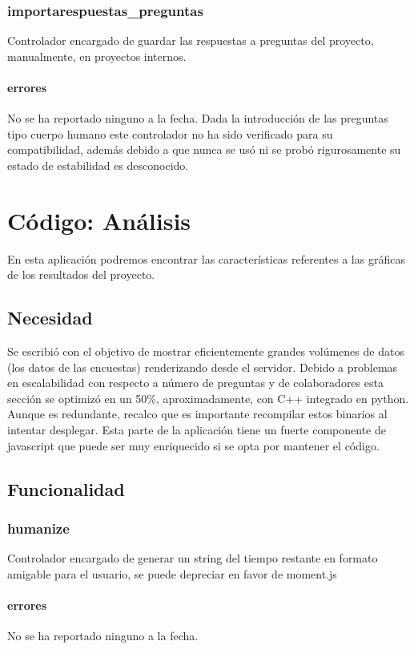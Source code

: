 \documentclass[10pt,a4paper]{book}
\begin{document}
	\subsection{importarespuestas\_preguntas}
	Controlador encargado de guardar las respuestas a preguntas del proyecto, manualmente, en proyectos internos.
	\subsubsection{errores}
	No se ha reportado ninguno a la fecha. Dada la introducción de las preguntas tipo cuerpo humano este controlador no ha sido verificado para su compatibilidad, además debido a que nunca se usó ni se probó rigurosamente su estado de estabilidad es desconocido.
	
	
	\chapter{Código: Análisis}
	
	En esta aplicación podremos encontrar las características referentes a las gráficas de los resultados del proyecto.
	
	\section{Necesidad}
	
	Se escribió con el objetivo de mostrar eficientemente grandes volúmenes de datos (los datos de las encuestas) renderizando desde el servidor. Debido a problemas en escalabilidad con respecto a número de preguntas y de colaboradores esta sección se optimizó en un 50\%, aproximadamente, con C++ integrado en python. Aunque es redundante, recalco que es importante recompilar estos binarios al intentar desplegar. Esta parte de la aplicación tiene un fuerte componente de javascript que puede ser muy enriquecido si se opta por mantener el código.
	
	\section{Funcionalidad}
		

	\subsection{humanize}
	Controlador encargado de generar un string del tiempo restante en formato amigable para el usuario, se puede depreciar en favor de moment.js
	\subsubsection{errores}
	No se ha reportado ninguno a la fecha.
	
\end{document}
